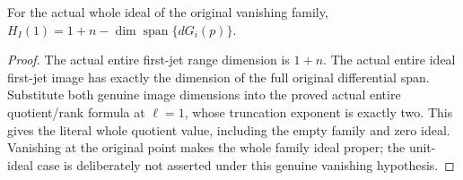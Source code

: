 \begin{lemma}
\label{hir:actual-first-hilbert-samuel-differential-rank}
\leanok
{}
For the actual whole ideal of the original vanishing family,
$H_I(1)=1+n-\dim\operatorname{span}\{dG_i(p)\}$.
\end{lemma}
\begin{proof}
The actual entire first-jet range dimension is $1+n$. The actual entire
ideal first-jet image has exactly the dimension of the full original
differential span. Substitute both genuine image dimensions into the
proved actual entire quotient/rank formula at $\ell=1$, whose truncation
exponent is exactly two. This gives the literal whole quotient value,
including the empty family and zero ideal. Vanishing at the original point
makes the whole family ideal proper; the unit-ideal case is deliberately
not asserted under this genuine vanishing hypothesis.
\end{proof}

